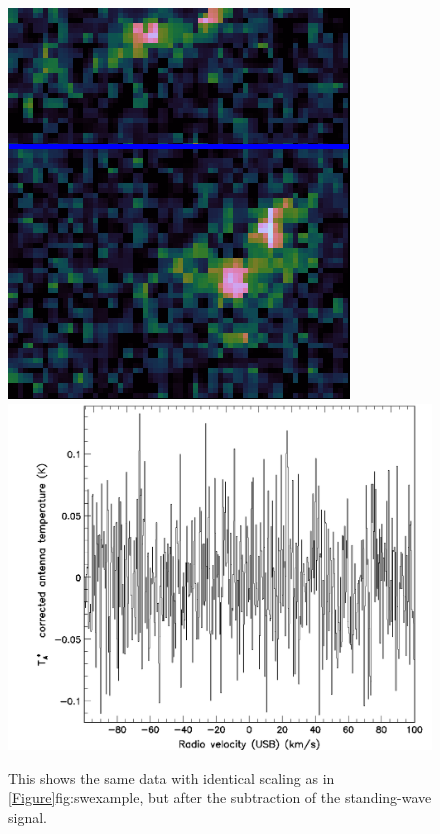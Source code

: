 \documentclass[11pt,oneside,chapters]{starlink}
\begin{document}
\begin{figure}[ht!]
\begin{center}
\includegraphics[align=c,width=0.375\linewidth]{sc20_noswimage}
\includegraphics[align=c,width=0.525\linewidth]{sc20_noswspectrum}
\caption[A reduced spectral cube with standing waves removed]
{\label{fig:noswexample}
  This shows the same data with identical scaling as in
  \cref{Figure}{fig:swexample}{}, but after the subtraction of the
  standing-wave signal.}
\end{center}
\end{figure}
\end{document}
